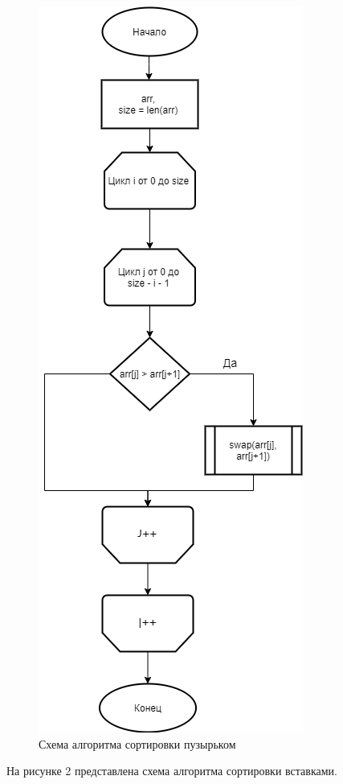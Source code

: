 \documentclass[a4paper, 12pt]{article}
\begin{document}
\begin{flushleft}
\begin{figure}[h!]
		\centering \includegraphics[scale=2.2]{bubble_graph}
		\centering \caption{Схема алгоритма сортировки пузырьком}
	\end{figure}
	\clearpage
	\newpage
	\hspace*{5mm} На рисунке 2 представлена схема алгоритма сортировки вставками.
	\begin{figure}[h]

\end{figure}
\end{flushleft}
\end{document}

